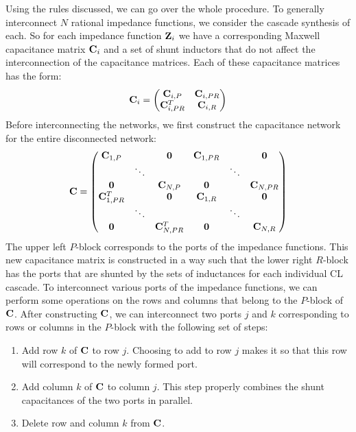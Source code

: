 Using the rules discussed, we can go over the whole procedure. To generally interconnect $N$ rational impedance functions, we consider the cascade synthesis of each. So for each impedance function $\vb{Z}_i$ we have a corresponding Maxwell capacitance matrix $\vb{C}_i$ and a set of shunt inductors that do not affect the interconnection of the capacitance matrices. Each of these capacitance matrices has the form:
\begin{equation}
    \vb{C}_i = \mqty(\vb{C}_{i,P} & \vb{C}_{i,PR} \\ \vb{C}_{i,PR}^T & \vb{C}_{i,R} )
\end{equation}
Before interconnecting the networks, we first construct the capacitance network for the entire disconnected network:
\begin{equation}
    \vb{C} = \mqty( 
        \vb{C}_{1,P} & & \vb{0}& \vb{C}_{1,PR} & & \vb{0} \\
        & \ddots & & & \ddots & \\
        \vb{0}& & \vb{C}_{N,P} & \vb{0} & & \vb{C}_{N,PR} \\
        \vb{C}_{1,PR}^T & & \vb{0} & \vb{C}_{1,R} & & \vb{0}\\
        & \ddots & & & \ddots & \\
        \vb{0}& & \vb{C}_{N,PR}^T & \vb{0} & & \vb{C}_{N,R}
     )
\end{equation}
The upper left $P$-block corresponds to the ports of the impedance functions. This new capacitance matrix is constructed in a way such that the lower right $R$-block has the ports that are shunted by the sets of inductances for each individual CL cascade. To interconnect various ports of the impedance functions, we can perform some operations on the rows and columns that belong to the $P$-block of $\vb{C}$. After constructing $\vb{C}$, we can interconnect two ports $j$ and $k$ corresponding to rows or columns in the $P$-block with the following set of steps:
\begin{enumerate}
    \item Add row $k$ of $\vb{C}$ to row $j$. Choosing to add to row $j$ makes it so that this row will correspond to the newly formed port.
    \item Add column $k$ of $\vb{C}$ to column $j$. This step properly combines the shunt capacitances of the two ports in parallel.
    \item Delete row and column $k$ from $\vb{C}$.
\end{enumerate}
